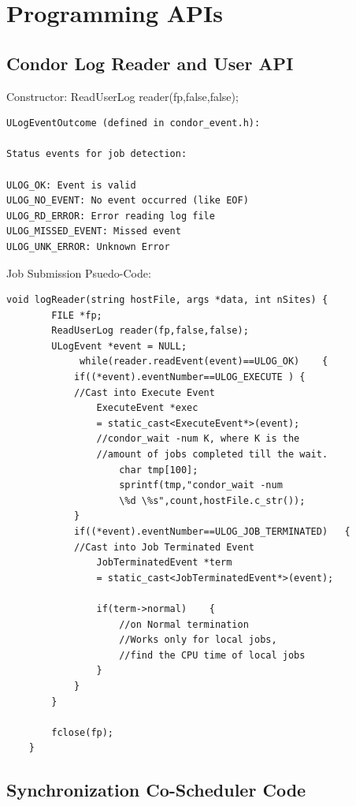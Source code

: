 \documentclass[ms,electronic,double]{nuthesis}
\begin{document}
\section{Programming APIs}
\subsection{Condor Log Reader and User API}
Constructor:
ReadUserLog reader(fp,false,false);
\begin{verbatim}
ULogEventOutcome (defined in condor_event.h):

Status events for job detection:

ULOG_OK: Event is valid
ULOG_NO_EVENT: No event occurred (like EOF)
ULOG_RD_ERROR: Error reading log file
ULOG_MISSED_EVENT: Missed event
ULOG_UNK_ERROR: Unknown Error
\end{verbatim}

Job Submission Psuedo-Code:

\begin{lstlisting}
void logReader(string hostFile, args *data, int nSites)	{		
		FILE *fp;
		ReadUserLog reader(fp,false,false);
		ULogEvent *event = NULL;		
             while(reader.readEvent(event)==ULOG_OK)	{                    
            if((*event).eventNumber==ULOG_EXECUTE )	{                                
            //Cast into Execute Event
                ExecuteEvent *exec 
                = static_cast<ExecuteEvent*>(event);                                       
                //condor_wait -num K, where K is the 
                //amount of jobs completed till the wait.
                    char tmp[100];
                    sprintf(tmp,"condor_wait -num 
                    \%d \%s",count,hostFile.c_str());
            }            
            if((*event).eventNumber==ULOG_JOB_TERMINATED)	{                
            //Cast into Job Terminated Event
                JobTerminatedEvent *term 
                = static_cast<JobTerminatedEvent*>(event);                
                
                if(term->normal)	{                    
                    //on Normal termination
                    //Works only for local jobs, 
                    //find the CPU time of local jobs
                }               
            }
        }
        
		fclose(fp);
	}

\end{lstlisting}
\subsection{Synchronization Co-Scheduler Code}
\end{document}

